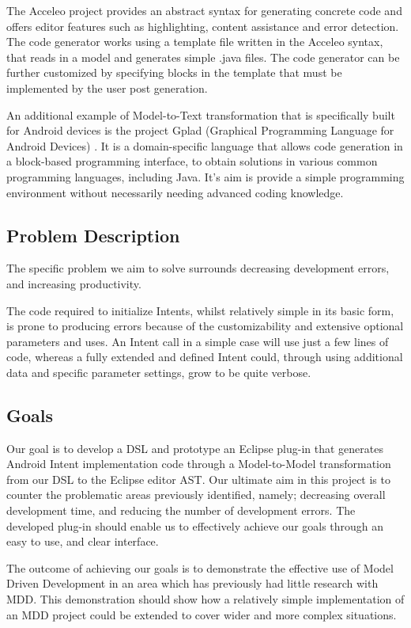 The Acceleo project provides an abstract syntax for generating concrete code and offers editor features such as highlighting, content assistance and error detection. The code generator works using a template file written in the Acceleo syntax, that reads in a model and generates simple .java files. The code generator can be further customized by specifying blocks in the template that must be implemented by the user post generation.

An additional example of Model-to-Text transformation that is specifically built for Android devices is the project Gplad (Graphical Programming Language for Android Devices) \cite{gplad}. It is a domain-specific language that allows code generation in a block-based programming interface, to obtain solutions in various common programming languages, including Java. It's aim is provide a simple programming environment without necessarily needing advanced coding knowledge.

\subsection{Problem Description} 
The specific problem we aim to solve surrounds decreasing development errors, and increasing productivity.

The code required to initialize Intents, whilst relatively simple in its basic form, is prone to producing errors because of the customizability and extensive optional parameters and uses. An Intent call in a simple case will use just a few lines of code, whereas a fully extended and defined Intent could, through using additional data and specific parameter settings, grow to be quite verbose.

\subsection{Goals}
Our goal is to develop a DSL and prototype an Eclipse plug-in that generates Android Intent implementation code through a Model-to-Model transformation from our DSL to the Eclipse editor AST. Our ultimate aim in this project is to counter the problematic areas previously identified, namely; decreasing overall development time, and reducing the number of development errors. The developed plug-in should enable us to effectively achieve our goals through an easy to use, and clear interface.

The outcome of achieving our goals is to demonstrate the effective use of Model Driven Development in an area which has previously had little research with MDD. This demonstration should show how a relatively simple implementation of an MDD project could be extended to cover wider and more complex situations.

